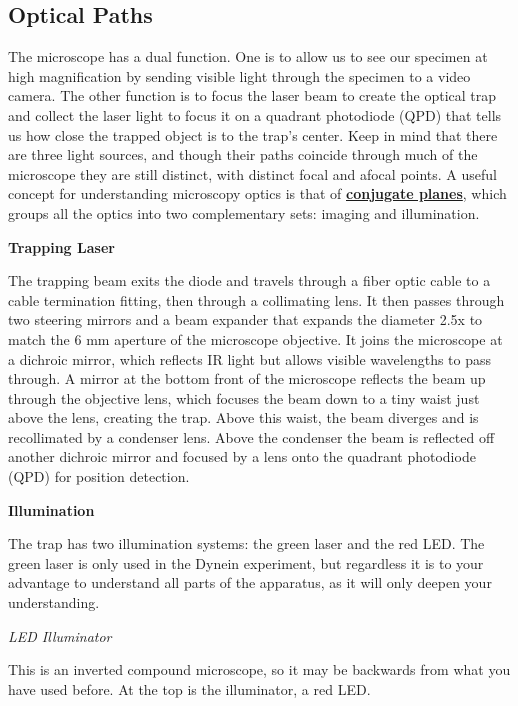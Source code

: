 \documentclass{../lab}
\begin{document}
\subsection{Optical Paths}

The microscope has a dual function. One is to allow us to see our specimen at high magnification by sending visible light through the specimen to a video camera. The other function is to focus the laser beam to create the optical trap and collect the laser light to focus it on a quadrant photodiode (QPD) that tells us how close the trapped object is to the trap's center. Keep in mind that there are three light sources, and though their paths coincide through much of the microscope they are still distinct, with distinct focal and afocal points. A useful concept for understanding microscopy optics is that of \href{http://experimentationlab.berkeley.edu/sites/default/files/ConjugatePlanesOpticalMicroscopy.pdf}{\textbf{conjugate planes}}, which groups all the optics into two complementary sets: imaging and illumination.

\newpage

\textbf{Trapping Laser}

The trapping beam exits the diode and travels through a fiber optic cable to a cable termination fitting, then through a collimating lens. It then passes through two steering mirrors and a beam expander that expands the diameter 2.5x to match the 6 mm aperture of the microscope objective. It joins the microscope at a dichroic mirror, which reflects IR light but allows visible wavelengths to pass through. A mirror at the bottom front of the microscope reflects the beam up through the objective lens, which focuses the beam down to a tiny waist just above the lens, creating the trap. Above this waist, the beam diverges and is recollimated by a condenser lens. Above the condenser the beam is reflected off another dichroic mirror and focused by a lens onto the quadrant photodiode (QPD) for position detection.

\textbf{Illumination}

The trap has two illumination systems: the green laser and the red LED. The green laser is only used in the Dynein experiment, but regardless it is to your advantage to understand all parts of the apparatus, as it will only deepen your understanding.

\emph{LED Illuminator}

This is an inverted compound microscope, so it may be backwards from what you have used before. At the top is the illuminator, a red LED.
\end{document}
